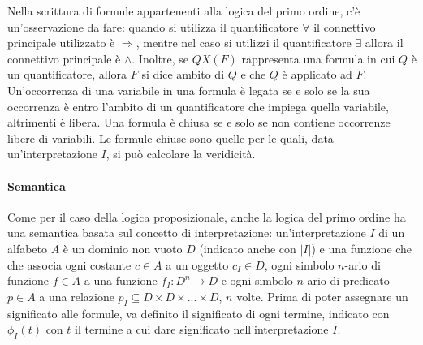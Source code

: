Nella scrittura di formule appartenenti alla logica del primo ordine, c'è un'osservazione da fare: quando si utilizza il quantificatore \(\forall\) il connettivo principale utilizzato è \(\Rightarrow\), mentre nel caso si utilizzi il quantificatore \(\exists\) allora il connettivo principale è \(\wedge\). Inoltre, se \(QX(F)\) rappresenta una formula in cui \(Q\) è un quantificatore, allora \(F\) si dice ambito di \(Q\) e che \(Q\) è applicato ad \(F\). Un'occorrenza di una variabile in una formula è legata se e solo se la sua occorrenza è entro l'ambito di un quantificatore che impiega quella variabile, altrimenti è libera. Una formula è chiusa se e solo se non contiene occorrenze libere di variabili. Le formule chiuse sono quelle per le quali, data un'interpretazione \(I\), si può calcolare la veridicità.

\paragraph*{Semantica}
Come per il caso della logica proposizionale, anche la logica del primo ordine ha una semantica basata sul concetto di interpretazione: un'interpretazione \(I\) di un alfabeto \(A\) è un dominio non vuoto \(D\) (indicato anche con \(|I|\)) e una funzione che che associa ogni costante \(c\in A\) a un oggetto \(c_I \in D\), ogni simbolo \(n\)-ario di funzione \(f\in A\) a una funzione \(f_I:D^n\to D\) e ogni simbolo \(n\)-ario di predicato \(p\in A\) a una relazione \(p_I\subseteq D\times D\times ... \times D\), \(n\) volte. Prima di poter assegnare un significato alle formule, va definito il significato di ogni termine, indicato con \(\phi_I(t)\) con \(t\) il termine a cui dare significato nell'interpretazione \(I\). 

\break

